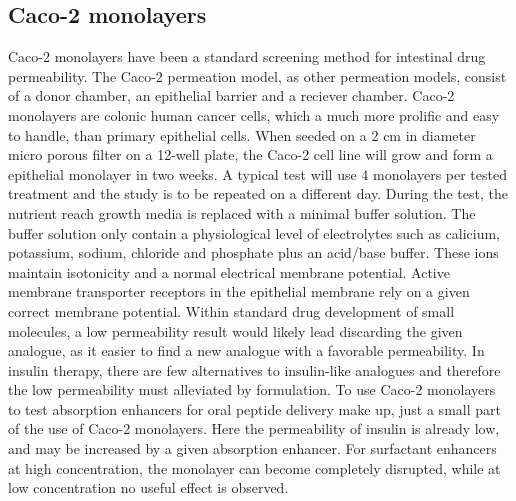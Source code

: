 \subsection{Caco-2 monolayers}
Caco-2 monolayers have been a standard screening method for intestinal drug permeability. The Caco-2 permeation model, as other permeation models, consist of a donor chamber, an epithelial barrier and a reciever chamber. Caco-2 monolayers are colonic human cancer cells, which a much more prolific and easy to handle, than primary epithelial cells. When seeded on a 2 cm in diameter micro porous filter on a 12-well plate, the Caco-2 cell line will grow and form a epithelial monolayer in two weeks. A typical test will use 4 monolayers per tested treatment and the study is to be repeated on a different day. During the test, the nutrient reach growth media is replaced with a minimal buffer solution. The buffer solution only contain a physiological level of electrolytes such as calicium, potassium, sodium, chloride and phosphate plus an acid/base buffer. These ions maintain isotonicity and a normal electrical membrane potential. Active membrane transporter receptors in the epithelial membrane rely on a given correct membrane potential. Within standard drug development of small molecules, a low permeability result would likely lead discarding the given analogue, as it easier to find a new analogue with a favorable permeability. In insulin therapy, there are few alternatives to insulin-like analogues and therefore the low permeability must alleviated by formulation. To use Caco-2 monolayers to test absorption enhancers for oral peptide delivery make up, just a small part of the use of Caco-2 monolayers. Here the permeability of insulin is already low, and may be increased by a given absorption enhancer. For surfactant enhancers at high concentration, the monolayer can become completely disrupted, while at low concentration no useful effect is observed.

